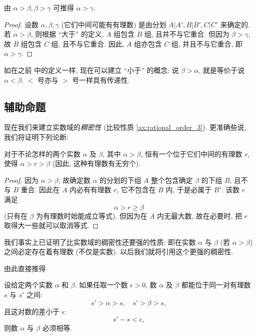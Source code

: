 {\kaishu
    \label{prop:real_order_2} 由 $\alpha > \beta, \beta > \gamma$ 可推得 $\alpha > \gamma$.
}

\begin{proof}
    设数 $\alpha, \beta, \gamma$ (它们中间可能有有理数) 是由分划 $A|A', B|B', C|C'$ 来确定的.
    若 $\alpha > \beta$, 则根据 “大于” 的定义, $A$ 组包含 $B$ 组, 且并不与它重合.
    但因为 $\beta > \gamma$, 故 $B$ 组包含 $C$ 组, 且不与它重合.
    因此, $A$ 组亦包含 $C$ 组, 并且不与它重合, 即 $\alpha > \gamma$.
\end{proof}

如在之前  中的定义一样, 现在可以建立 “小于” 的概念:
说 $\beta > \alpha$, 就是等价于说 $\alpha < \beta$.
$<$ 号亦与 $>$ 号一样具有传递性.

\subsection{辅助命题} \label{subsec:8}

现在我们来建立实数域的\emph{稠密性} (比较性质 \ref{ax:rational_order_3}).
更准确些说, 我们将证明下列论断:

\begin{lemma} \label{lem:choumi_1}
    对于不论怎样的两个实数 $\alpha$ 及 $\beta$, 其中 $\alpha > \beta$, 恒有一个位于它们中间的有理数 $r$, 使得 $\alpha > r > \beta$
    (因此, 这种有理数有无穷个).
\end{lemma}

\begin{proof}
    因为 $\alpha > \beta$, 故确定数 $\alpha$ 的分划的下组 $A$ 整个包含确定 $\beta$ 的下组 $B$, 且不与 $B$ 重合.
    因此在 $A$ 内必有有理数 $r$, 它不包含在 $B$ 内, 于是必属于 $B'$.
    该数 $r$ 满足
    $$
    \alpha > r \geq \beta
    $$
    (只有在 $\beta$ 为有理数时始能成立等式).
    但因为在 $A$ 内无最大数, 故在必要时, 把 $r$ 取得大一些就可以取消等式.
\end{proof}

\begin{remark}
    我们事实上已证明了比实数域的稠密性还要强的性质: 即在实数 $\alpha$ 与 $\beta$ (若 $\alpha > \beta$) 之间必定存在着有理数 (不仅是实数).
    以后我们就将引用这个更强的稠密性.
\end{remark}

由此直接推得

\begin{lemma} \label{lem:choumi_2}
    设给定两个实数 $\alpha$ 和 $\beta$.
    如果任取一个数 $\epsilon > 0$, 数 $\alpha$ 及 $\beta$ 都能位于同一对有理数 $s$ 与 $s'$ 之间:
    $$
    s' > \alpha > s, \quad s' > \beta > s,
    $$
    且这对数的差小于 $\epsilon$:
    $$
    s' - s < \epsilon,
    $$
    则数 $\alpha$ 与 $\beta$ 必须相等.
\end{lemma}

